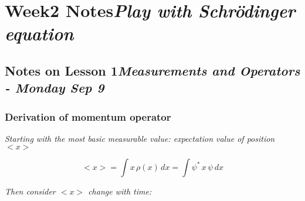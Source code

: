 \section{Week2 Notes\hfill\normalsize\textit{Play with Schrödinger equation}}\SectionRule

\subsection{Notes on Lesson 1\hfill\small\textit{Measurements and Operators - Monday Sep 9}}

    \subsubsection{Derivation of momentum operator}
    
    \textit{Starting with the most basic measurable value: \textit{expectation value of position} $<x>$}

    \[
        <x> = \int x\,\rho(x)\,dx = \int \psi^*\,x\,\psi\,dx
    \]

    \textit{Then consider $<x>$ change with time:}
    

